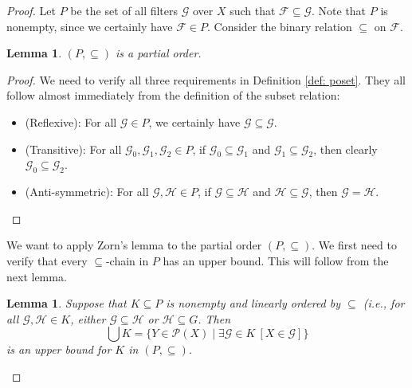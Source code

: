 \documentclass[a4paper]{memoir}
\newtheorem{lemma}[theorem]{Lemma}
\theoremstyle{definition}
\newcommand{\mc}{\mathcal}
\newcommand{\power}{\ensuremath{\mathscr{P}}}
\begin{document}
\begin{proof}
  Let $P$ be the set of all filters $\mathcal{G}$ over $X$ such that $\mathcal{F} \subseteq 
  \mathcal{G}$. Note that $P$ is nonempty, since we certainly have $\mathcal{F} \in P$. 
  Consider the binary relation $\subseteq$ on $\mathcal{F}$. 
  
  \begin{lemma}
    $(P, \subseteq)$ is a partial order.
  \end{lemma}
  
  \begin{proof}
    We need to verify all three requirements in Definition \ref{def: poset}. 
    They all follow almost immediately from the definition of the subset relation:
    \begin{itemize}
      \item (Reflexive): For all $\mc{G} \in P$, we certainly have $\mc{G} \subseteq \mc{G}$.
      \item (Transitive): For all $\mc{G}_0, \mc{G}_1, \mc{G}_2 \in P$, if 
      $\mc{G}_0 \subseteq \mc{G}_1$ and $\mc{G}_1 \subseteq \mc{G}_2$, then clearly 
      $\mc{G}_0 \subseteq \mc{G}_2$.
      \item (Anti-symmetric): For all $\mc{G}, \mc{H} \in P$, if 
      $\mc{G} \subseteq \mc{H}$ and $\mc{H} \subseteq \mc{G}$, then $\mc{G} = \mc{H}$.
    \end{itemize}
  \end{proof}
  
  We want to apply Zorn's lemma to the partial order $(P, \subseteq)$. We first need to verify 
  that every $\subseteq$-chain in $P$ has an upper bound. This will follow from the next lemma.
  
  \begin{lemma}
    Suppose that $K \subseteq P$ is nonempty and linearly ordered by $\subseteq$ (i.e., for all 
    $\mc{G}, \mc{H} \in K$, either $\mc{G} \subseteq \mc{H}$ or $\mc{H} \subseteq {G}$.
    Then 
    \[
      \bigcup K = \{Y \in \power(X) \mid \exists \mc{G} \in K \ [X \in \mc{G}]\}
    \]
    is an upper bound for $K$ in $(P, \subseteq)$.
  \end{lemma}
  

\end{proof}
\end{document}
